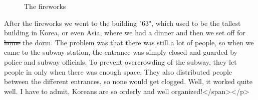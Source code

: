 \begin{post}
\begin{content}
\begin{figure}[h]
\centering
{}
\caption{The fireworks}
\end{figure}

After the fireworks we went to the building "63", which used to be the tallest building in Korea, or even Asia, where we had a dinner and then we set off for \sout{home} the dorm. The problem was that there was still a lot of people, so when we came to the subway station, the entrance was simply closed and guarded by police and subway officials. To prevent overcrowding of the subway, they let people in only when there was enough space. They also distributed people between the different entrances, so none would get clogged. Well, it worked quite well. I have to admit, Koreans are so orderly and well organized!</span></p>

\begin{figure}[h]
\centering
{}
\end{figure}


\end{content}
\end{post}

